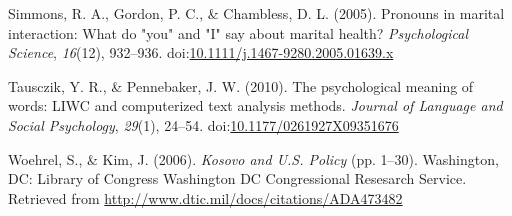 \documentclass[english,,man]{apa6}
\begin{document}
\leavevmode\hypertarget{ref-Simmons2005}{}%
Simmons, R. A., Gordon, P. C., \& Chambless, D. L. (2005). Pronouns in marital interaction: What do "you" and "I" say about marital health? \emph{Psychological Science}, \emph{16}(12), 932--936. doi:\href{https://doi.org/10.1111/j.1467-9280.2005.01639.x}{10.1111/j.1467-9280.2005.01639.x}

\leavevmode\hypertarget{ref-Tausczik2010}{}%
Tausczik, Y. R., \& Pennebaker, J. W. (2010). The psychological meaning of words: LIWC and computerized text analysis methods. \emph{Journal of Language and Social Psychology}, \emph{29}(1), 24--54. doi:\href{https://doi.org/10.1177/0261927X09351676}{10.1177/0261927X09351676}

\leavevmode\hypertarget{ref-Woehrel2006}{}%
Woehrel, S., \& Kim, J. (2006). \emph{Kosovo and U.S. Policy} (pp. 1--30). Washington, DC: Library of Congress Washington DC Congressional Resesarch Service. Retrieved from \url{http://www.dtic.mil/docs/citations/ADA473482}
\end{document}
